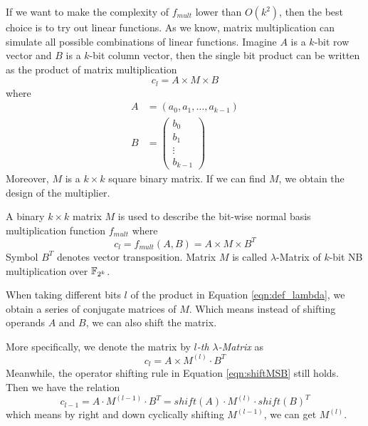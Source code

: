 If we want to make the complexity of $f_{mult}$ lower than $O(k^2)$, then the best choice is to try out 
linear functions. As we know, matrix multiplication can simulate all possible combinations of 
linear functions. 
Imagine $A$ is a $k$-bit row vector and $B$ is a $k$-bit 
column vector, then the single bit product can be written as the product of matrix multiplication
$$c_{l} = A\times M\times B$$
where 
\begin{align*}
A &= (a_0,a_1,\dots,a_{k-1})\\
B &= \begin{pmatrix}
b_0 \\
b_1 \\
\vdots \\
b_{k-1}
\end{pmatrix}
\end{align*}
Moreover, $M$ is a $k\times k$ square binary matrix. If we can find $M$, we obtain the design of the multiplier.

\begin{Definition}
A binary $k\times k$ matrix $M$ is used to describe the bit-wise normal basis multiplication function $f_{mult}$ where
\begin{equation}
\label{eqn:def_lambda}
c_{l} = f_{mult}(A, B) = A \times M \times B^T
\end{equation}
Symbol $B^T$ denotes vector transposition. Matrix $M$ is called $\lambda$-Matrix of
$k$-bit NB multiplication over ${\mathbb{F}}_{2^k}$.
\end{Definition} 

When taking different bits $l$ of the product in Equation \ref{eqn:def_lambda}, 
we obtain a series of conjugate matrices of $M$. 
Which means instead of shifting operands $A$ and $B$, we can also shift the 
matrix.

More specifically, we denote the matrix by \emph{$l$-th $\lambda$-Matrix} as 
$$c_l = A \times M^{(l)} \cdot B^T$$
Meanwhile, the operator shifting rule in Equation \ref{eqn:shiftMSB} still holds. Then we have the relation 
$$c_{l-1} = A \cdot M^{(l-1)} \cdot B^T = shift(A) \cdot M^{(l)} \cdot shift(B)^T$$ which means
by right and down cyclically shifting $M^{(l-1)}$, we can get $M^{(l)}$.

